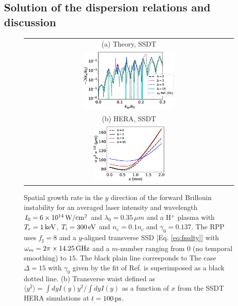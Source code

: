 \documentclass[
 reprint,
 amsmath,amssymb,
 aps,
]{revtex4-1}
\begin{document}
\subsection{Solution of the dispersion relations and discussion }\label{sec:sol}
\begin{figure}
\begin{tabular}{c}
(a) Theory, SSDT \\
\includegraphics[width=0.45\textwidth,trim={-2cm 0 0 0},clip]{SSD_H+1keV300eV.eps}\\
(b) HERA, SSDT \\
\includegraphics[width=0.35\textwidth]{y2m_ssdt.eps}
\end{tabular}
\caption{ \label{fig:ssdt} 
Spatial growth rate in the $y$ direction of the forward Brillouin instability for an averaged laser intensity and wavelength $I_0=6\times 10^{14}\,\rm W/cm^2$ and  $\lambda_0=0.35\,\mu m$ and a  H$^+$  plasma with $T_e =1\,\rm  keV$, $ T_i=300\,  \rm eV$  and
 $n_{e}=0.1n_c$ and $\gamma_0=0.137$.
The RPP uses $f_\sharp = 8$ and a $y$-aligned transverse SSD [Eq. \eqref{eq:fssdty}] with $\omega_m=2\pi \times14.25\,\rm GHz$ and a $m$-number ranging from $0$ (no temporal smoothing) to $15$.
The black plain line corresponds to 
The case $\Delta=15$ with $\gamma_0$ given by the fit of Ref. \cite[]{casanova_1989} is superimposed as a black dotted line.
(b) Transverse waist defined as $\langle y^2\rangle=\int dyI(y)y^2 /\int dyI(y)$ as a function of $x$  from the SSDT HERA   simulations at $t=100\,\rm ps$.
}
\end{figure}
\end{document}
